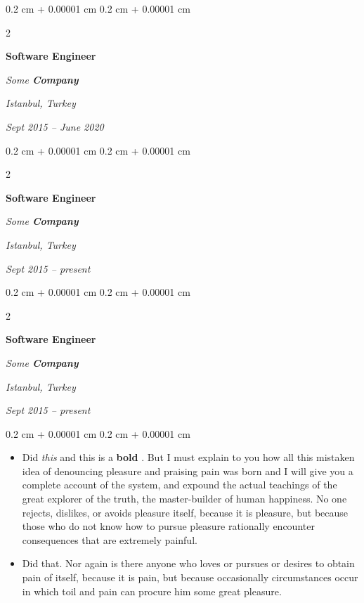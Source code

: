 \documentclass[10pt, letterpaper]{article}
\newenvironment{highlights}{
    \begin{itemize}[
        topsep=0.10 cm,
        parsep=0.10 cm,
        partopsep=0pt,
        itemsep=0pt,
        leftmargin=0.4 cm + 10pt
    ]
}{
    \end{itemize}
} %
\newenvironment{onecolentry}{
    \begin{adjustwidth}{
        0.2 cm + 0.00001 cm
    }{
        0.2 cm + 0.00001 cm
    }
}{
    \end{adjustwidth}
} %
\newenvironment{twocolentry}[2][]{
    \onecolentry
    \def\secondColumn{#2}
    \setcolumnwidth{\fill, 4.5 cm}
    \begin{paracol}{2}
}{
    \switchcolumn \raggedleft \secondColumn
    \end{paracol}
    \endonecolentry
} %
\let\hrefWithoutArrow\href
\renewcommand{\href}[2]{\hrefWithoutArrow{#1}{\ifthenelse{\equal{#2}{}}{ }{#2 }\raisebox{.15ex}{\footnotesize \faExternalLink*}}}
\begin{document}
        \vspace{0.2 cm}

        \begin{twocolentry}{
        \textit{Istanbul, Turkey}    
            
        \textit{Sept 2015 – June 2020}}
            \textbf{Software Engineer}
            
            \textit{Some \textbf{Company}}
        \end{twocolentry}



        \vspace{0.2 cm}

        \begin{twocolentry}{
        \textit{Istanbul, Turkey}    
            
        \textit{Sept 2015 – present}}
            \textbf{Software Engineer}
            
            \textit{Some \textbf{Company}}
        \end{twocolentry}



        \vspace{0.2 cm}

        \begin{twocolentry}{
        \textit{Istanbul, Turkey}    
            
        \textit{Sept 2015 – present}}
            \textbf{Software Engineer}
            
            \textit{Some \textbf{Company}}
        \end{twocolentry}

        \vspace{0.10 cm}
        \begin{onecolentry}
            \begin{highlights}
                \item Did \textit{this} and this is a \textbf{bold} \href{https://example.com}{link}. But I must explain to you how all this mistaken idea of denouncing pleasure and praising pain was born and I will give you a complete account of the system, and expound the actual teachings of the great explorer of the truth, the master-builder of human happiness. No one rejects, dislikes, or avoids pleasure itself, because it is pleasure, but because those who do not know how to pursue pleasure rationally encounter consequences that are extremely painful.
                \item Did that. Nor again is there anyone who loves or pursues or desires to obtain pain of itself, because it is pain, but because occasionally circumstances occur in which toil and pain can procure him some great pleasure.
            \end{highlights}
        \end{onecolentry}
\end{document}
